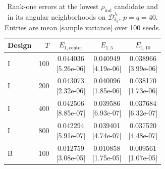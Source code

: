 \documentclass[12pt,letterpaper]{article}
\def\spacingset#1{\renewcommand{\baselinestretch}{#1}\small\normalsize}
\theoremstyle{plain}
\theoremstyle{definition}
\begin{document}
\begin{table}[p]
\begin{minipage}{0.98\linewidth}
\end{minipage}
\endgroup
\end{table}

\clearpage
\begin{table}[p]
\begingroup
\spacingset{1.0}
\small\centering
\caption{Rank-one errors at the lowest $\rho_{\mathrm{ind}}$ candidate and in its angular neighborhoods on $\mathcal D^\lambda_{\delta_0}$, $p=q=40$. Entries are mean [sample variance] over 100 seeds.}
\label{s23:lambda:selectedtab:cap_comparison}
\footnotesize
\setlength{\tabcolsep}{4pt}
\renewcommand{\arraystretch}{1.03}
\begin{adjustbox}{max width=\linewidth}
\begin{tabular}{lrccc}
\toprule
Design & $T$ & $E_{1,\mathrm{center}}$ & $E_{1,5}$ & $E_{1,10}$\\
\midrule
I & 100 & \shortstack{0.044036\\[-1pt]{\scriptsize[5.26e-06]}} & \shortstack{0.040949\\[-1pt]{\scriptsize[4.19e-06]}} & \shortstack{0.038966\\[-1pt]{\scriptsize[3.99e-06]}}\\
I & 200 & \shortstack{0.043073\\[-1pt]{\scriptsize[2.32e-06]}} & \shortstack{0.040096\\[-1pt]{\scriptsize[1.85e-06]}} & \shortstack{0.038170\\[-1pt]{\scriptsize[1.73e-06]}}\\
I & 400 & \shortstack{0.042506\\[-1pt]{\scriptsize[8.85e-07]}} & \shortstack{0.039586\\[-1pt]{\scriptsize[6.93e-07]}} & \shortstack{0.037684\\[-1pt]{\scriptsize[6.32e-07]}}\\
I & 800 & \shortstack{0.042294\\[-1pt]{\scriptsize[5.91e-07]}} & \shortstack{0.039401\\[-1pt]{\scriptsize[4.74e-07]}} & \shortstack{0.037520\\[-1pt]{\scriptsize[4.48e-07]}}\\
\addlinespace
B & 100 & \shortstack{0.012759\\[-1pt]{\scriptsize[3.08e-05]}} & \shortstack{0.010858\\[-1pt]{\scriptsize[1.75e-05]}} & \shortstack{0.009561\\[-1pt]{\scriptsize[1.07e-05]}}\\

\end{tabular}
\end{adjustbox}
\end{table}
\end{document}

